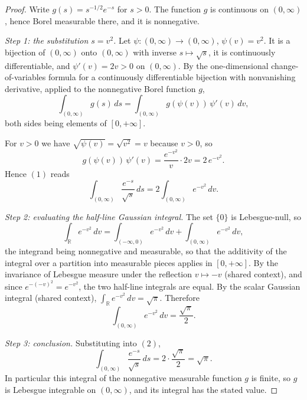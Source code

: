 \begin{proof}
Write $g(s) = s^{-1/2}e^{-s}$ for $s > 0$.  The function $g$ is continuous on
$(0,\infty)$, hence Borel measurable there, and it is nonnegative.

\emph{Step 1: the substitution $s = v^2$.}
Let $\psi : (0,\infty) \to (0,\infty)$, $\psi(v) = v^2$.  It is a bijection of
$(0,\infty)$ onto $(0,\infty)$ with inverse $s \mapsto \sqrt s$, it is
continuously differentiable, and $\psi'(v) = 2v > 0$ on $(0,\infty)$.  By the
one-dimensional change-of-variables formula for a continuously differentiable
bijection with nonvanishing derivative, applied to the nonnegative Borel
function $g$,
\begin{equation*}
  \int_{(0,\infty)} g(s)\,ds
    = \int_{(0,\infty)} g(\psi(v))\,\psi'(v)\,dv , \tag{1}
\end{equation*}
both sides being elements of $[0,+\infty]$.

For $v > 0$ we have $\sqrt{\psi(v)} = \sqrt{v^2} = v$ because $v > 0$, so
\[
  g(\psi(v))\,\psi'(v)
    = \frac{e^{-v^2}}{v}\cdot 2v
    = 2\,e^{-v^2} .
\]
Hence $(1)$ reads
\begin{equation*}
  \int_{(0,\infty)} \frac{e^{-s}}{\sqrt s}\,ds
    = 2\int_{(0,\infty)} e^{-v^2}\,dv . \tag{2}
\end{equation*}

\emph{Step 2: evaluating the half-line Gaussian integral.}
The set $\{0\}$ is Lebesgue-null, so
\[
  \int_{\mathbb{R}} e^{-v^2}\,dv
    = \int_{(-\infty,0)} e^{-v^2}\,dv + \int_{(0,\infty)} e^{-v^2}\,dv ,
\]
the integrand being nonnegative and measurable, so that the additivity of the
integral over a partition into measurable pieces applies in $[0,+\infty]$.  By
the invariance of Lebesgue measure under the reflection $v \mapsto -v$ (shared
context), and since $e^{-(-v)^2} = e^{-v^2}$, the two half-line integrals are
equal.  By the scalar Gaussian integral (shared context),
$\int_{\mathbb{R}} e^{-v^2}\,dv = \sqrt\pi$.  Therefore
\[
  \int_{(0,\infty)} e^{-v^2}\,dv = \frac{\sqrt\pi}{2} .
\]

\emph{Step 3: conclusion.}
Substituting into $(2)$,
\[
  \int_{(0,\infty)} \frac{e^{-s}}{\sqrt s}\,ds = 2\cdot\frac{\sqrt\pi}{2} = \sqrt\pi .
\]
In particular this integral of the nonnegative measurable function $g$ is
finite, so $g$ is Lebesgue integrable on $(0,\infty)$, and its integral has the
stated value.
\end{proof}

